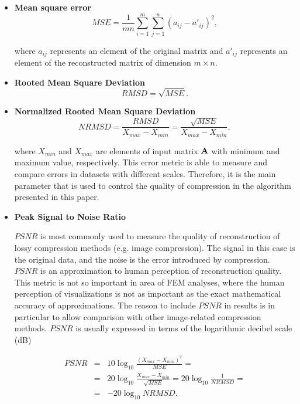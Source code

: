 \begin{itemize}
\item \textbf{Mean square error}
\begin{equation}
\mathit{MSE}=\frac{1}{m n} \sum_{i=1}^{m} \sum_{j=1}^{n} (a_{ij} - a'_{ij})^{2},
\label{eq:mse-def}
\end{equation}

\noindent
where $a_{ij}$ represents an element of the original matrix and $a'_{ij}$ represents an element of the
reconstructed matrix of dimension $m \times n$.

\item \textbf{Rooted Mean Square Deviation}
\begin{equation}
\mathit{RMSD} = \sqrt{\mathit{MSE}}.
\label{eq:rmsd-def}
\end{equation}

\item \textbf{Normalized Rooted Mean Square Deviation}
\begin{equation}
\mathit{NRMSD} = \frac{\mathit{RMSD}}{X_{max}-X_{min}}=\frac{\sqrt{\mathit{MSE}}}{X_{max}-X_{min}},
\label{eq:nrmsd-def}
\end{equation}

\noindent
where $X_{min}$ and $X_{max}$ are elements of input matrix $\mathbf{A}$ with minimum and maximum value, respectively. This error metric is able to measure and compare errors in datasets with different scales. Therefore, it is the main parameter that is used to control the quality of compression in the algorithm presented in this paper.

\item \textbf{Peak Signal to Noise Ratio}

$\mathit{PSNR}$ is most commonly used to measure the quality of reconstruction of lossy compression methods (e.g. image compression). The signal in this case is the original data, and the noise is the error introduced by compression. $\mathit{PSNR}$ is an approximation to human perception of reconstruction quality. This metric is not so important in area of FEM analyses, where the human perception of visualizations is not as important as the exact mathematical accuracy of approximations. The reason to include $\mathit{PSNR}$ in results is in particular to allow comparison with other image-related compression methods. $\mathit{PSNR}$ is usually expressed in terms of the logarithmic decibel scale (dB)

\begin{eqnarray}
\mathit{PSNR} &=& 10\log_{10}\frac{(X_{max}-X_{min})^{2}}{\mathit{MSE}} =
\\
&=& 20\log_{10}\frac{X_{max}-X_{min}}{\sqrt{\mathit{MSE}}}=20\log_{10}\frac{1}{\mathit{NRMSD}} = \nonumber
\\
&=& -20\log_{10}\mathit{NRMSD}. \nonumber
\label{eq:psnr-def}
\end{eqnarray}

\end{itemize}



